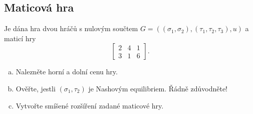 \documentclass[11pt,a4paper]{article}
\begin{document}
\subsection*{Maticová hra}
Je dána hra dvou hráčů s nulovým součtem $G = ((\sigma_1, \sigma_2),(\tau_1, \tau_2, \tau_3), u)$ a maticí hry
\[
    \begin{bmatrix}
        2 & 4 & 1 \\
        3 & 1 & 6
    \end{bmatrix}.
\]
\begin{enumerate}[(a)]
    \item Nalezněte horní a dolní cenu hry.
    \item Ověřte, jestli $(\sigma_1, \tau_2)$ je Nashovým equilibriem. Řádně zdůvodněte!
    \item Vytvořte smíšené rozšíření zadané maticové hry.
\end{enumerate} 
\end{document}
